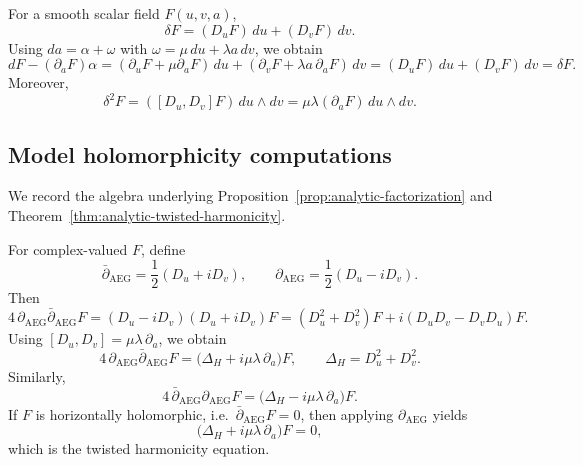 For a smooth scalar field $F(u,v,a)$,
\[
\delta F=(D_uF)\,du+(D_vF)\,dv.
\]
Using $da=\alpha+\omega$ with $\omega=\mu\,du+\lambda a\,dv$, we obtain
\[
dF-(\partial_aF)\alpha
=(\partial_uF+\mu\partial_aF)\,du+(\partial_vF+\lambda a\,\partial_aF)\,dv
=(D_uF)\,du+(D_vF)\,dv
=\delta F.
\]
Moreover,
\[
\delta^2F=([D_u,D_v]F)\,du\wedge dv=\mu\lambda(\partial_aF)\,du\wedge dv.
\]

\subsection{Model holomorphicity computations}\label{subsec:appB-holomorphic}

We record the algebra underlying Proposition~\ref{prop:analytic-factorization} and Theorem~\ref{thm:analytic-twisted-harmonicity}.

For complex-valued $F$, define
\[
\bar\partial_{\mathrm{AEG}}=\frac12(D_u+iD_v),
\qquad
\partial_{\mathrm{AEG}}=\frac12(D_u-iD_v).
\]
Then
\[
4\,\partial_{\mathrm{AEG}}\bar\partial_{\mathrm{AEG}}F
=(D_u-iD_v)(D_u+iD_v)F
=(D_u^2+D_v^2)F+i(D_uD_v-D_vD_u)F.
\]
Using $[D_u,D_v]=\mu\lambda\,\partial_a$, we obtain
\[
4\,\partial_{\mathrm{AEG}}\bar\partial_{\mathrm{AEG}}F
=\bigl(\Delta_H+i\mu\lambda\,\partial_a\bigr)F,
\qquad
\Delta_H=D_u^2+D_v^2.
\]
Similarly,
\[
4\,\bar\partial_{\mathrm{AEG}}\partial_{\mathrm{AEG}}F
=\bigl(\Delta_H-i\mu\lambda\,\partial_a\bigr)F.
\]
If $F$ is horizontally holomorphic, i.e.\ $\bar\partial_{\mathrm{AEG}}F=0$, then applying $\partial_{\mathrm{AEG}}$ yields
\[
\bigl(\Delta_H+i\mu\lambda\,\partial_a\bigr)F=0,
\]
which is the twisted harmonicity equation.
